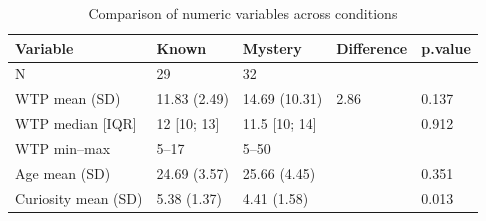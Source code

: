 \begin{table}

\caption{\label{tab:tab:numeric_compare}Comparison of numeric variables across conditions}
\centering
\begin{tabular}[t]{lllll}
\toprule
Variable & Known & Mystery & Difference & p.value\\
\midrule
N & 29 & 32 &  & \\
WTP mean (SD) & 11.83 (2.49) & 14.69 (10.31) & 2.86 & 0.137\\
WTP median [IQR] & 12 [10; 13] & 11.5 [10; 14] &  & 0.912\\
WTP min--max & 5--17 & 5--50 &  & \\
Age mean (SD) & 24.69 (3.57) & 25.66 (4.45) &  & 0.351\\
\addlinespace
Curiosity mean (SD) & 5.38 (1.37) & 4.41 (1.58) &  & 0.013\\
\bottomrule
\end{tabular}
\end{table}
